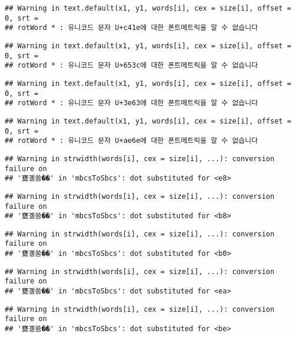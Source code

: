 \documentclass[]{article}
\begin{document}
\begin{verbatim}
## Warning in text.default(x1, y1, words[i], cex = size[i], offset = 0, srt =
## rotWord * : 유니코드 문자 U+c41e에 대한 폰트메트릭을 알 수 없습니다
\end{verbatim}

\begin{verbatim}
## Warning in text.default(x1, y1, words[i], cex = size[i], offset = 0, srt =
## rotWord * : 유니코드 문자 U+653c에 대한 폰트메트릭을 알 수 없습니다
\end{verbatim}

\begin{verbatim}
## Warning in text.default(x1, y1, words[i], cex = size[i], offset = 0, srt =
## rotWord * : 유니코드 문자 U+3e63에 대한 폰트메트릭을 알 수 없습니다
\end{verbatim}

\begin{verbatim}
## Warning in text.default(x1, y1, words[i], cex = size[i], offset = 0, srt =
## rotWord * : 유니코드 문자 U+ae6e에 대한 폰트메트릭을 알 수 없습니다
\end{verbatim}

\begin{verbatim}
## Warning in strwidth(words[i], cex = size[i], ...): conversion failure on
## '甕곌쑴��' in 'mbcsToSbcs': dot substituted for <e8>
\end{verbatim}

\begin{verbatim}
## Warning in strwidth(words[i], cex = size[i], ...): conversion failure on
## '甕곌쑴��' in 'mbcsToSbcs': dot substituted for <b8>
\end{verbatim}

\begin{verbatim}
## Warning in strwidth(words[i], cex = size[i], ...): conversion failure on
## '甕곌쑴��' in 'mbcsToSbcs': dot substituted for <b0>
\end{verbatim}

\begin{verbatim}
## Warning in strwidth(words[i], cex = size[i], ...): conversion failure on
## '甕곌쑴��' in 'mbcsToSbcs': dot substituted for <ea>
\end{verbatim}

\begin{verbatim}
## Warning in strwidth(words[i], cex = size[i], ...): conversion failure on
## '甕곌쑴��' in 'mbcsToSbcs': dot substituted for <be>
\end{verbatim}
\end{document}
